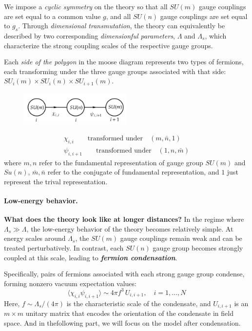 \documentclass[12pt]{article}
\numberwithin{equation}{section}
\newcommand{\avg}[1]{\langle #1 \rangle}
\newcommand{\tif}[1]{\textit{\textbf{#1}}}
\begin{document}
We impose a \textit{cyclic symmetry} on the theory so that all $SU(m)$ gauge couplings are set equal to a common value $g$, and all $SU(n)$ gauge couplings are set equal to $g_s$. Through \textit{dimensional transmutation}, the theory can equivalently be described by two corresponding \textit{dimensionful parameters}, $\Lambda$ and $\Lambda_s$, which characterize the strong coupling scales of the respective gauge groups.

Each \textit{side of the polygon} in the moose diagram represents two types of fermions, each transforming under the three gauge groups associated with that side: $SU_i(m) \times SU_i(n) \times SU_{i+1}(m)$.
\begin{figure}[H]
    \centering
    \includegraphics[width=0.5\textwidth]{Side.png}
\end{figure}
\begin{gather}
    \chi_{i,i}\qquad \text{transformed under}\quad (m,\bar{n},1)\\
    \psi_{i,i+1}\qquad \text{transformed under}\quad (1,n,\bar{m}) 
\end{gather}
where $m,n$ refer to the fundamental representation of gauge group $SU(m)$ and $Su(n)$, $\bar{m},\bar{n}$ refer to the conjugate of fundamental representation, and $1$ just represent the trival representation.

\paragraph{Low-energy behavior.}

\textbf{What does the theory look like at longer distances?} In the regime where $\Lambda_s \gg \Lambda$, the low-energy behavior of the theory becomes relatively simple. At energy scales around $\Lambda_s$, the $SU(m)$ gauge couplings remain weak and can be treated perturbatively. In contrast, each $SU(n)$ gauge group becomes strongly coupled at this scale, leading to \tif{fermion condensation}.

Specifically, pairs of fermions associated with each strong gauge group condense, forming nonzero vacuum expectation values:
\[
\avg{\chi_{i,i} \psi_{i,i+1}} \sim 4\pi f^3\, U_{i,i+1}, \quad i = 1,\dots, N
\]
Here, $f \sim \Lambda_s / (4\pi)$ is the characteristic scale of the condensate, and $U_{i,i+1}$ is an $m \times m$ unitary matrix that encodes the orientation of the condensate in field space. And in thefollowing part, we will focus on the model after condensation. 
\end{document}

